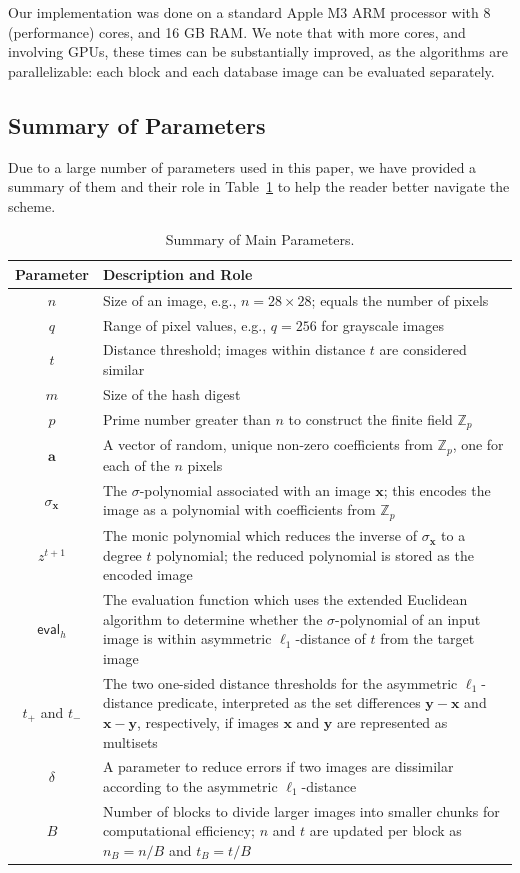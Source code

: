 \documentclass[pdflatex,sn-mathphys-num]{sn-jnl}
\theoremstyle{definition}
\newcommand{\vtr}[1]{\mathbf{#1}}
\begin{document}
Our implementation was done on a standard Apple M3 ARM processor with 8 (performance) cores, and 16 GB RAM. We note that with more cores, and involving GPUs, these times can be substantially improved, as the algorithms are parallelizable: each block and each database image can be evaluated separately. 

\subsection{Summary of Parameters}
\label{subsec:params}
Due to a large number of parameters used in this paper, we have provided a summary of them and their role in Table~\ref{tab:params} to help the reader better navigate the scheme. 


\begin{table}[h]
\centering
\begin{tabularx}{\textwidth}{c|X}
Parameter & Description and Role \\
\hline \hline
$n$ & Size of an image, e.g., $n = 28 \times 28$; equals the number of pixels \\
$q$ & Range of pixel values, e.g., $q = 256$ for grayscale images \\
$t$ & Distance threshold; images within distance $t$ are considered similar\\
$m$ & Size of the hash digest\\
$p$ & Prime number greater than $n$ to construct the finite field $\mathbb{Z}_p$\\
$\vtr{a}$ & A vector of random, unique non-zero coefficients from $\mathbb{Z}_p$, one for each of the $n$ pixels\\
$\sigma_\vtr{x}$ & The $\sigma$-polynomial associated with an image $\vtr{x}$; this encodes the image as a polynomial with coefficients from $\mathbb{Z}_p$\\
$z^{t+1}$ & The monic polynomial which reduces the inverse of $\sigma_\vtr{x}$ to a degree $t$ polynomial; the reduced polynomial is stored as the encoded image \\
$\mathsf{eval}_h$ & The evaluation function which uses the extended Euclidean algorithm to determine whether the $\sigma$-polynomial of an input image is within asymmetric $\ell_1$-distance of $t$ from the target image \\
$t_+$ and $t_-$ & The two one-sided distance thresholds for the asymmetric $\ell_1$-distance predicate, interpreted as the set differences $\vtr{y} - \vtr{x}$ and $\vtr{x} - \vtr{y}$, respectively, if images $\vtr{x}$ and $\vtr{y}$ are represented as multisets \\
$\delta$ & A parameter to reduce errors if two images are dissimilar according to the asymmetric $\ell_1$-distance \\
$B$ & Number of blocks to divide larger images into smaller chunks for computational efficiency; $n$ and $t$ are updated per block as $n_B = n/B$ and $t_B = t/B$
\end{tabularx}
\caption{Summary of Main Parameters.}
\label{tab:params}
\end{table}
\end{document}
